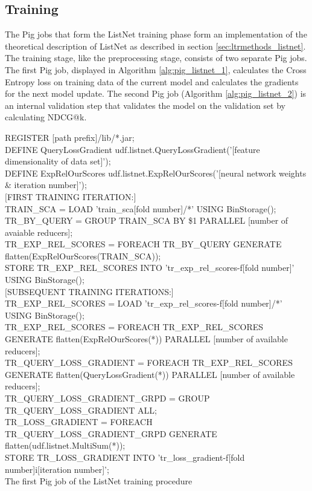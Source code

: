\subsection{Training}
The Pig jobs that form the ListNet training phase form an implementation of the theoretical description of ListNet as described in section \ref{sec:ltrmethods_listnet}. The training stage, like the preprocessing stage, consists of two separate Pig jobs. The first Pig job, displayed in Algorithm \ref{alg:pig_listnet_1}, calculates the Cross Entropy loss on training data of the current model and calculates the gradients for the next model update. The second Pig job (Algorithm \ref{alg:pig_listnet_2}) is an internal validation step that validates the model on the validation set by calculating \ac{NDCG}@k.\\

\begin{algorithm}
REGISTER [path prefix]/lib/*.jar;\\
DEFINE QueryLossGradient udf.listnet.QueryLossGradient('[feature dimensionality of data set]');\\
DEFINE ExpRelOurScores udf.listnet.ExpRelOurScores('[neural network weights \& iteration number]');\\
$[$FIRST TRAINING ITERATION:$]$\\
\Indp
	TRAIN\_SCA = LOAD 'train\_sca[fold number]/*' USING BinStorage();\\
	TR\_BY\_QUERY = GROUP TRAIN\_SCA BY \$1 PARALLEL [number of avaiable reducers];\\
	TR\_EXP\_REL\_SCORES = FOREACH TR\_BY\_QUERY GENERATE flatten(ExpRelOurScores(TRAIN\_SCA));\\
	STORE TR\_EXP\_REL\_SCORES INTO 'tr\_exp\_rel\_scores-f[fold number]' USING BinStorage();\\
\Indm 
$[$SUBSEQUENT TRAINING ITERATIONS:$]$\\
\Indp
TR\_EXP\_REL\_SCORES = LOAD 'tr\_exp\_rel\_scores-f[fold number]/*' USING BinStorage();\\
TR\_EXP\_REL\_SCORES = FOREACH TR\_EXP\_REL\_SCORES GENERATE flatten(ExpRelOurScores(*)) PARALLEL [number of available reducers];\\
\Indm
TR\_QUERY\_LOSS\_GRADIENT = FOREACH TR\_EXP\_REL\_SCORES GENERATE flatten(QueryLossGradient(*)) PARALLEL [number of available reducers];\\
TR\_QUERY\_LOSS\_GRADIENT\_GRPD = GROUP TR\_QUERY\_LOSS\_GRADIENT ALL;\\
TR\_LOSS\_GRADIENT = FOREACH TR\_QUERY\_LOSS\_GRADIENT\_GRPD GENERATE flatten(udf.listnet.MultiSum(*));\\
STORE TR\_LOSS\_GRADIENT INTO 'tr\_loss\_gradient-f[fold number]i[iteration number]';\\
\caption{The first Pig job of the ListNet training procedure}
\label{alg:pig_listnet_1}
\end{algorithm}

